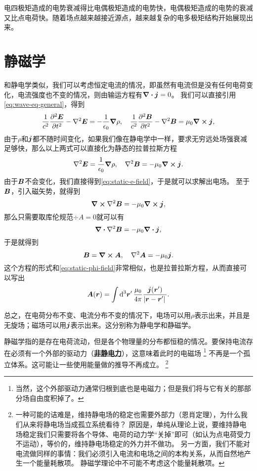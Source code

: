 \documentclass[UTF8, a4paper]{ctexart}
\newcommand*{\concept}[1]{\underline{\textbf{#1}}}
\begin{document}
电四极矩造成的电势衰减得比电偶极矩造成的电势快，电偶极矩造成的电势的衰减又比点电荷快。随着场点越来越接近源点，越来越复杂的电多极矩结构开始展现出来。

\section{静磁学}

和静电学类似，我们可以考虑恒定电流的情况，即虽然有电流但是没有任何电荷变化，电流强度也不变的情况，则由输运方程有$\div{\vb*{j}}=0$。
我们可以直接引用\eqref{eq:wave-eq-general}，得到
\[
    \frac{1}{c^2} \pdv[2]{\vb*{E}}{t} - \laplacian{\vb*{E}} = - \frac{1}{\epsilon_0} \grad{\rho} , \quad \frac{1}{c^2} \pdv[2]{\vb*{B}}{t} - \laplacian{\vb*{B}} = \mu_0 \curl{\vb*{j}},
\]
由于$\rho$和$\vb*{j}$都不随时间变化，如果我们像在静电学中一样，要求无穷远处场强衰减足够快，那么以上两式可以直接化为静态的拉普拉斯方程
\[
    \laplacian{\vb*{E}} = \frac{1}{\epsilon_0} \grad{\rho}, \quad \laplacian{\vb*{B}} = - \mu_0 \curl{\vb*{j}}.
\]
由于$\vb*{B}$不会变化，我们直接得到\eqref{eq:static-e-field}，于是就可以求解出电场。
至于$\vb*{B}$，引入磁矢势，就得到
\[
    \curl{\laplacian{\vb*{B}}} = - \mu_0 \curl{\vb*{j}},
\]
那么只需要取库伦规范$\div{A}=0$就可以有
\[
    \div{\laplacian{\vb*{B}}} = - \mu_0 \div{\vb*{j}},
\]
于是就得到
\begin{equation}
    \vb*{B} = \curl{\vb*{A}}, \quad \laplacian{\vb*{A}} = - \mu_0 \vb*{j}.
\end{equation}
这个方程的形式和\eqref{eq:static-phi-field}非常相似，也是拉普拉斯方程，从而直接可以写出
\begin{equation}
    \vb*{A}(\vb*{r}) = \int \dd[3]{\vb*{r}'} \frac{\mu_0}{4\pi} \frac{\vb*{j}(\vb*{r}')}{\abs*{\vb*{r} - \vb*{r}'}}.
    \label{eq:from-j-to-a}
\end{equation}

总之，在电荷分布不变、电流分布不变的情况下，电场可以用$\rho$表示出来，并且是无旋场；磁场可以用$\vb*{j}$表示出来。这分别称为静电学和静磁学。

静磁学指的是存在电荷流动，但是各个物理量的分布都恒稳的情况。要保持电流存在必须有一个外部的驱动力（\concept{非静电力}），这意味着此时的电磁场%
\footnote{
    当然，这个外部驱动力通常归根到底也是电磁力；但是我们将与它有关的那部分场自由度积掉了。
}%
不再是一个孤立体系。这可能让一些使用能量做的推导不再成立。%
\footnote{
    一种可能的诘难是，维持静电场的稳定也需要外部力（恩肖定理），为什么我们从来将静电场当成孤立系统看待？
    原因是，单纯从理论上说，要维持静电场稳定我们只需要将各个导体、电荷的动力学“关掉”即可（如认为点电荷受力不运动），等价的，维持静电场稳定的外力并不做功。
    另一方面，我们不能对电流做同样的事情：我们必须引入电流和电场之间的本构关系，从而自然地产生一个能量耗散项。
    静磁学理论中不可能不考虑这个能量耗散项。
}%
\end{document}
